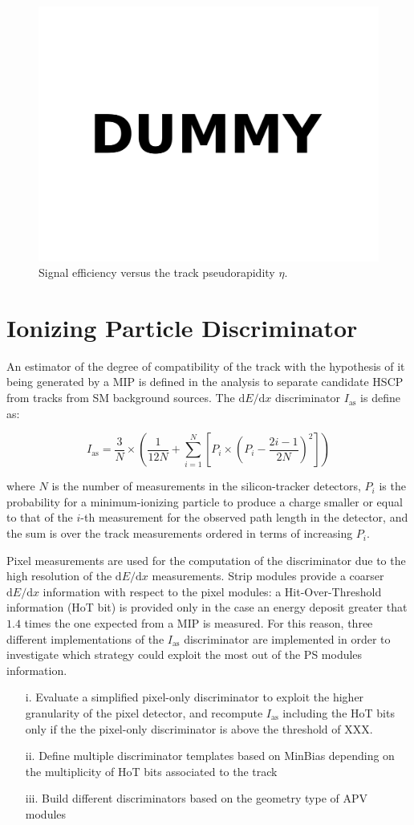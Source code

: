 \documentclass[11pt,twoside,a4paper]{article}
\begin{document}
\begin{figure}
\centering
\includegraphics[width=.5\textwidth]{figures/dummy.pdf}
\caption{Signal efficiency versus the track pseudorapidity $\eta$.\label{fig:effeta}}
\end{figure}


\section{Ionizing Particle Discriminator}

An estimator of the degree of compatibility of the track with the hypothesis of it being generated by a MIP is defined in the analysis to separate candidate HSCP from tracks from SM background sources.
The $\mathrm{d}E/\mathrm{d}x$ discriminator $I_{\mathrm{as}}$ is define as:

$$
I_{\mathrm{as}} = \frac{3}{N} \times \left( \frac{1}{12N} + \sum_{i=1}^{N} \left[ P_i \times \left( P_i - \frac{2i-1}{2N} \right)^2 \right] \right)
$$

where $N$ is the number of measurements in the silicon-tracker detectors, $P_i$ is the probability for a minimum-ionizing particle to produce a charge smaller or equal to that of the $i$-th measurement for the observed path length in the detector, and the sum is over the track measurements ordered in terms of increasing $P_i$.

Pixel measurements are used for the computation of the discriminator due to the high resolution of the $\mathrm{d}E/\mathrm{d}x$ measurements.
Strip modules provide a coarser $\mathrm{d}E/\mathrm{d}x$ information with respect to the pixel modules: a Hit-Over-Threshold information (HoT bit) is provided only in the case an energy deposit greater that $1.4$ times the one expected from a MIP is measured.
For this reason, three different implementations of the $I_{\mathrm{as}}$ discriminator are implemented in order to investigate which strategy could exploit the most out of the PS modules information.

\begin{itemize}
 \item[i.]   Evaluate a simplified pixel-only discriminator to exploit the higher granularity of the pixel detector, and recompute $I_{\mathrm{as}}$ including the HoT bits only if the the pixel-only discriminator is above the threshold of XXX.
 \item[ii.]  Define multiple discriminator templates based on MinBias depending on the multiplicity of HoT bits associated to the track
 \item[iii.] Build different discriminators based on the  geometry type of APV modules
\end{itemize}
\end{document}
